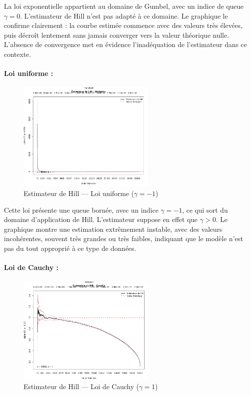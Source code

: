 \documentclass{article}
\begin{document}
La loi exponentielle appartient au domaine de Gumbel, avec un indice de queue $\gamma = 0$. L’estimateur de Hill n’est pas adapté à ce domaine. Le graphique le confirme clairement : la courbe estimée commence avec des valeurs très élevées, puis décroît lentement sans jamais converger vers la valeur théorique nulle. L’absence de convergence met en évidence l’inadéquation de l’estimateur dans ce contexte.
\paragraph{Loi uniforme :}
\begin{figure}[H]
    \centering
    \includegraphics[width=0.6\textwidth]{./images/hill_uniforme.png}
    \caption{Estimateur de Hill — Loi uniforme ($\gamma = -1$)}
\end{figure}

Cette loi présente une queue bornée, avec un indice $\gamma = -1$, ce qui sort du domaine d’application de Hill. L’estimateur suppose en effet que $\gamma > 0$. Le graphique montre une estimation extrêmement instable, avec des valeurs incohérentes, souvent très grandes ou très faibles, indiquant que le modèle n’est pas du tout approprié à ce type de données. 
\paragraph{Loi de Cauchy :}
\begin{figure}[H]
    \centering
    \includegraphics[width=0.6\textwidth]{./images/hill_cauchy.png}
    \caption{Estimateur de Hill — Loi de Cauchy ($\gamma = 1$)}
\end{figure}
\end{document}
